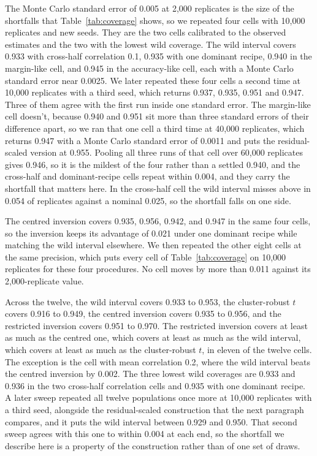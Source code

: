 The Monte Carlo standard error of 0.005 at 2,000 replicates is the size of the shortfalls that Table~\ref{tab:coverage} shows, so we repeated four cells with 10,000 replicates and new seeds. They are the two cells calibrated to the observed estimates and the two with the lowest wild coverage. The wild interval covers 0.933 with cross-half correlation 0.1, 0.935 with one dominant recipe, 0.940 in the margin-like cell, and 0.945 in the accuracy-like cell, each with a Monte Carlo standard error near 0.0025. We later repeated these four cells a second time at 10,000 replicates with a third seed, which returns 0.937, 0.935, 0.951 and 0.947. Three of them agree with the first run inside one standard error. The margin-like cell doesn't, because 0.940 and 0.951 sit more than three standard errors of their difference apart, so we ran that one cell a third time at 40,000 replicates, which returns 0.947 with a Monte Carlo standard error of 0.0011 and puts the residual-scaled version at 0.955. Pooling all three runs of that cell over 60,000 replicates gives 0.946, so it is the mildest of the four rather than a settled 0.940, and the cross-half and dominant-recipe cells repeat within 0.004, and they carry the shortfall that matters here. In the cross-half cell the wild interval misses above in 0.054 of replicates against a nominal 0.025, so the shortfall falls on one side.

The centred inversion covers 0.935, 0.956, 0.942, and 0.947 in the same four cells, so the inversion keeps its advantage of 0.021 under one dominant recipe while matching the wild interval elsewhere. We then repeated the other eight cells at the same precision, which puts every cell of Table~\ref{tab:coverage} on 10,000 replicates for these four procedures. No cell moves by more than 0.011 against its 2,000-replicate value.

Across the twelve, the wild interval covers 0.933 to 0.953, the cluster-robust $t$ covers 0.916 to 0.949, the centred inversion covers 0.935 to 0.956, and the restricted inversion covers 0.951 to 0.970. The restricted inversion covers at least as much as the centred one, which covers at least as much as the wild interval, which covers at least as much as the cluster-robust $t$, in eleven of the twelve cells. The exception is the cell with mean correlation 0.2, where the wild interval beats the centred inversion by 0.002. The three lowest wild coverages are 0.933 and 0.936 in the two cross-half correlation cells and 0.935 with one dominant recipe. A later sweep repeated all twelve populations once more at 10,000 replicates with a third seed, alongside the residual-scaled construction that the next paragraph compares, and it puts the wild interval between 0.929 and 0.950. That second sweep agrees with this one to within 0.004 at each end, so the shortfall we describe here is a property of the construction rather than of one set of draws.

